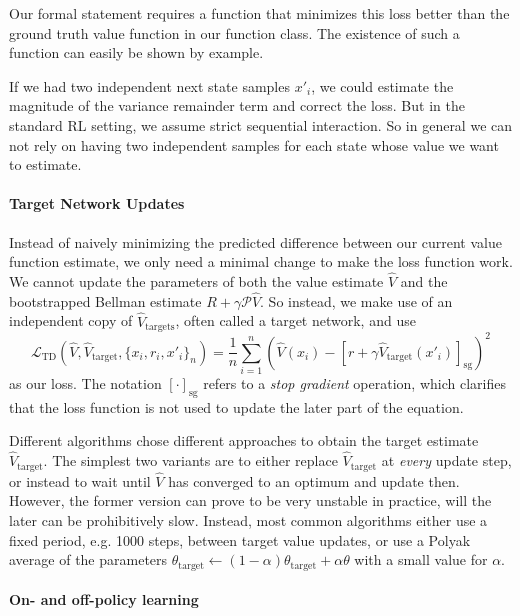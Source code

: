 Our formal statement requires a function that minimizes this loss better than the ground truth value function in our function class.
The existence of such a function can easily be shown by example.

If we had two independent next state samples $x'_i$, we could estimate the magnitude of the variance remainder term and correct the loss.
But in the standard RL setting, we assume strict sequential interaction.
So in general we can not rely on having two independent samples for each state whose value we want to estimate.

\paragraph{Target Network Updates}

Instead of naively minimizing the predicted difference between our current value function estimate, we only need a minimal change to make the loss function work.
We cannot update the parameters of both the value estimate $\hat{V}$ and the bootstrapped Bellman estimate $R + \gamma \mathcal{P} \hat{V}$.
So instead, we make use of an independent copy of $\hat{V}_\mathrm{targets}$, often called a target network, and use
\[
    \mathcal{L}_\mathrm{TD}\left(\hat{V}, \hat{V}_\mathrm{target}, \{x_i, r_i, x'_i\}_{n}\right) = \frac{1}{n} \sum_{i=1}^n \left(\hat{V}(x_i) - \left[r + \gamma \hat{V}_\mathrm{target}(x'_i)\right]_\mathrm{sg}\right)^2
\]
as our loss.
The notation $[\cdot]_\mathrm{sg}$ refers to a \emph{stop gradient} operation, which clarifies that the loss function is not used to update the later part of the equation.

Different algorithms chose different approaches to obtain the target estimate $\hat{V}_\mathrm{target}$.
The simplest two variants are to either replace $\hat{V}_\mathrm{target}$ at \emph{every} update step, or instead to wait until $\hat{V}$ has converged to an optimum and update then.
However, the former version can prove to be very unstable in practice, will the later can be prohibitively slow.
Instead, most common algorithms either use a fixed period, e.g. 1000 steps, between target value updates, or use a Polyak average of the parameters $\theta_\mathrm{target} \leftarrow (1 - \alpha) \theta_\mathrm{target} + \alpha \theta$ with a small value for $\alpha$.

\paragraph{On- and off-policy learning}

